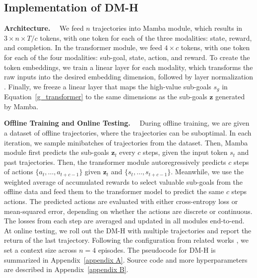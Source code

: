 \subsection{Implementation of DM-H}

\noindent\textbf{Architecture.}~~
We feed $n$ trajectories into Mamba module, which results in $3\times n\times T/c$ tokens, with one token for each of the three modalities: state, reward, and completion. In the transformer module, we feed $4\times c$ tokens, with one token for each of the four modalities: sub-goal, state, action, and reward. To create the token embeddings, we train a linear layer for each modality, which transforms the raw inputs into the desired embedding dimension, followed by layer normalization \cite{26}. Finally, we freeze a linear layer that maps the high-value sub-goals $s_g$ in Equation~\eqref{g_transformer} to the same dimensions as the sub-goals $\textbf{z}$ generated by Mamba.

\noindent\textbf{Offline Training and Online Testing.}~~
During offline training, we are given a dataset of offline trajectories, where the trajectories can be suboptimal.
In each iteration, we sample minibatches of trajectories from the dataset. 
Then, Mamba module first predicts the sub-goals $\textbf{z}_t$ every $c$ steps, given the input token $s_t$ and past trajectories. Then, the transformer module autoregressively predicts $c$ steps of actions $\{a_t,\dots,a_{t+c-1}\}$ given $\textbf{z}_t$ and $\{s_t,\dots,s_{t+c-1}\}$. 
Meanwhile, we use the weighted average of accumulated rewards to select valuable sub-goals from the offline data and feed them to the transformer model to predict the same $c$ steps actions.
The predicted actions are evaluated with either cross-entropy loss or mean-squared error, depending on whether the actions are discrete or continuous. The losses from each step are averaged and updated in all modules end-to-end. At online testing, we roll out the DM-H with multiple trajectories and report the return of the last trajectory. Following the configuration from related works \cite{1,8}, we set a context size across $n=4$ episodes.
The pseudocode for DM-H is summarized in Appendix~\ref{appendix A}. Source code and more hyperparameters are described in Appendix~\ref{appendix B}.

